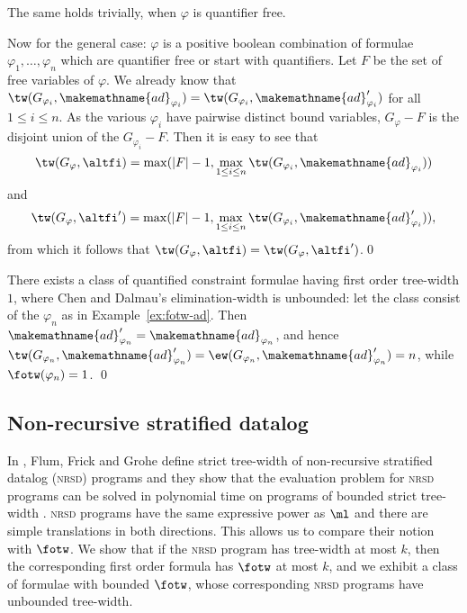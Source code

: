 \documentclass{LMCS}
\newcommand{\gfi}{G_{\varphi}}
\newcommand{\nrsd}{\textsc{nrsd}}
\renewcommand{\phi}{\varphi}
\newcommand{\alte}{\makemathname{ad}}
\begin{document}
The same holds trivially, when $\phi$ is quantifier free. 

Now for the general case: $\phi$ is a positive boolean combination 
of formulae $\phi_1,\ldots,\phi_n$ 
which are quantifier free or start with quantifiers. 
Let $F$ be the set of free variables of $\phi$. 
We already know 
that $\tw(G_{\phi_i},\alte_{\phi_i})=\tw(G_{\phi_i},\alte'_{\phi_i})$ 
for all $1\leq i\leq n$. 
As the various $\phi_i$ have pairwise distinct bound variables, 
$\gfi-F$ is the disjoint union of the $G_{\phi_i}-F$. 
Then it is easy to see that 
\[ \tw(\gfi,\altfi)
  =\max(|F|-1,\max\limits_{1\leq i\leq n}\tw(G_{\phi_i},\alte_{\phi_i})) \]
and
\[ \tw(\gfi,\altfi')
  =\max(|F|-1,\max\limits_{1\leq i\leq n}\tw(G_{\phi_i},\alte'_{\phi_i})) , \]
from which it follows that $\tw(\gfi,\altfi)=\tw(\gfi,\altfi')$.\qed 

\begin{rem}\label{rem:fotw-CD}
	There exists a class of quantified constraint formulae having first order
	tree-width $1$, where Chen and Dalmau's elimination-width is unbounded: 
	let the class consist of the $\phi_n$ as in Example~\ref{ex:fotw-ad}. Then 
	$\alte'_{\phi_n}=\alte_{\phi_n}$, and hence 
	$\tw(G_{\phi_n},\alte'_{\phi_n})=\ew(G_{\phi_n},\alte'_{\phi_n})=n$, while
	$\fotw(\phi_n)= 1$. 
\qed\end{rem}




\subsection{Non-recursive stratified datalog}
In \cite{flufrigro01}, Flum, Frick and Grohe define strict tree-width of non-recursive
stratified datalog (\nrsd) programs and they show that the evaluation problem
for \nrsd{} programs can be solved in polynomial time on programs of bounded
strict tree-width \cite[Corollary 5.26]{flufrigro01}.  \nrsd{} programs have the same
expressive power as $\ml$ 
and there are simple translations in both directions. 
This allows us to compare their notion
with $\fotw$. We show that if the \nrsd{} program has tree-width at most $k$,
then the corresponding first order formula has $\fotw$ at most $k$, and we
exhibit a class of formulae with bounded $\fotw$, whose corresponding \nrsd{}
programs  have unbounded tree-width.
\end{document}
